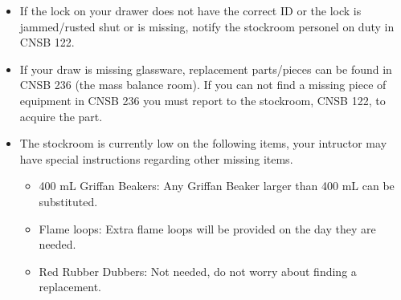 \documentclass[12pt]{article}
\begin{document}
\begin{itemize}
\item If the lock on your drawer does not have the correct ID or the lock is jammed/rusted shut or is missing, notify the stockroom personel on duty in CNSB 122.
\item If your draw is missing glassware, replacement parts/pieces can be found in CNSB 236 (the mass balance room). If you can not find a missing piece of equipment in CNSB 236 you must report to the stockroom, CNSB 122, to acquire the part.
\item The stockroom is currently low on the following items, your intructor may have special instructions regarding other missing items.
\begin{itemize}
\item 400 mL Griffan Beakers: Any Griffan Beaker larger than 400 mL can be substituted.
\item Flame loops: Extra flame loops will be provided on the day they are needed.
\item Red Rubber Dubbers: Not needed, do not worry about finding a replacement.
\end{itemize}
\end{itemize}
\end{document}
